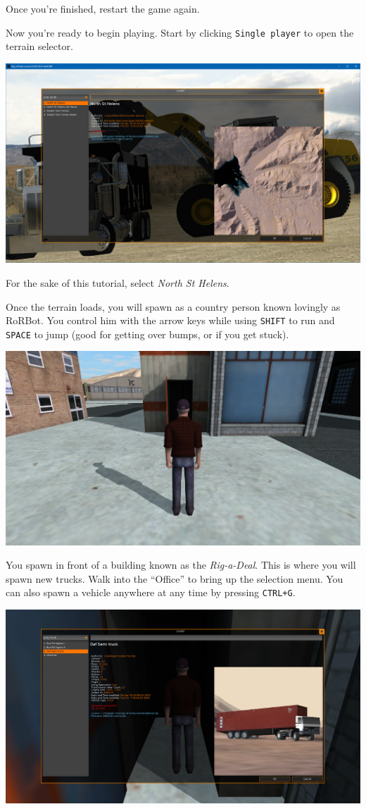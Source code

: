 Once you're finished, restart the game again.

Now you're ready to begin playing. Start by clicking
\texttt{Single\ player} to open the terrain selector.

\includegraphics{images/bg-terrnselect.png}

For the sake of this tutorial, select \emph{North St Helens}.

Once the terrain loads, you will spawn as a country person known
lovingly as RoRBot. You control him with the arrow keys while using
\texttt{SHIFT} to run and \texttt{SPACE} to jump (good for getting over
bumps, or if you get stuck).

\includegraphics{images/bg-rorbot.png}

You spawn in front of a building known as the \emph{Rig-a-Deal}. This is
where you will spawn new trucks. Walk into the ``Office'' to bring up
the selection menu. You can also spawn a vehicle anywhere at any time by
pressing \texttt{CTRL+G}.

\includegraphics{images/bg-vehselect.png}

